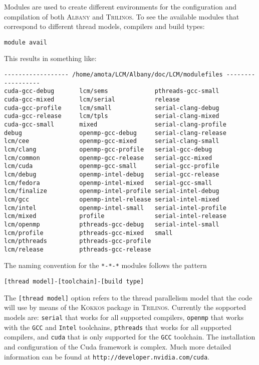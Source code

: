 \documentclass{article}
\newcommand{\trilinos}{\textsc{Trilinos}}
\newcommand{\albany}{\textsc{Albany}}
\newcommand{\kokkos}{\textsc{Kokkos}}
\begin{document}
Modules are used to create different environments for the
configuration and compilation of both \albany{} and \trilinos{}. To
see the available modules that correspond to different thread models,
compilers and build types:
\begin{verbatim}
module avail
\end{verbatim}
This results in something like:
\begin{verbatim}
------------------ /home/amota/LCM/Albany/doc/LCM/modulefiles ------------------
cuda-gcc-debug       lcm/sems             pthreads-gcc-small
cuda-gcc-mixed       lcm/serial           release
cuda-gcc-profile     lcm/small            serial-clang-debug
cuda-gcc-release     lcm/tpls             serial-clang-mixed
cuda-gcc-small       mixed                serial-clang-profile
debug                openmp-gcc-debug     serial-clang-release
lcm/cee              openmp-gcc-mixed     serial-clang-small
lcm/clang            openmp-gcc-profile   serial-gcc-debug
lcm/common           openmp-gcc-release   serial-gcc-mixed
lcm/cuda             openmp-gcc-small     serial-gcc-profile
lcm/debug            openmp-intel-debug   serial-gcc-release
lcm/fedora           openmp-intel-mixed   serial-gcc-small
lcm/finalize         openmp-intel-profile serial-intel-debug
lcm/gcc              openmp-intel-release serial-intel-mixed
lcm/intel            openmp-intel-small   serial-intel-profile
lcm/mixed            profile              serial-intel-release
lcm/openmp           pthreads-gcc-debug   serial-intel-small
lcm/profile          pthreads-gcc-mixed   small
lcm/pthreads         pthreads-gcc-profile
lcm/release          pthreads-gcc-release
\end{verbatim}
The naming convention for the \verb+*-*-*+ modules follows the pattern
\begin{verbatim}
[thread model]-[toolchain]-[build type]
\end{verbatim}
The \verb+[thread model]+ option refers to the thread parallelism
model that the code will use by means of the \kokkos{} package in
\trilinos{}. Currently the sopported models are: \verb+serial+ that
works for all supported compilers, \verb+openmp+ that works with the
\verb+GCC+ and \verb+Intel+ toolchains, \verb+pthreads+ that works for
all supported compilers, and \verb+cuda+ that is only supported for
the \verb+GCC+ toolchain. The installation and configuration of the
Cuda framework is complex. Much more detailed information can be found
at \verb+http://developer.nvidia.com/cuda+.
\end{document}
